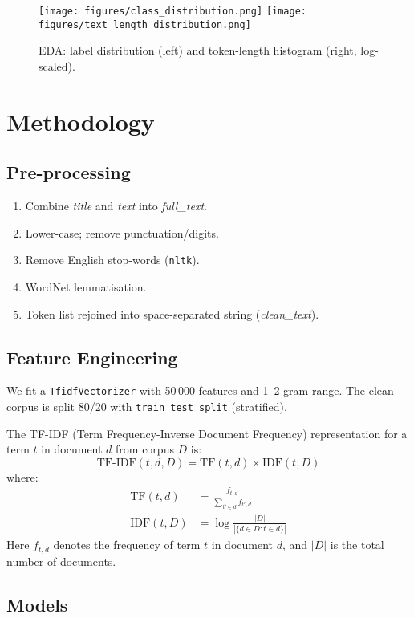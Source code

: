 \documentclass[11pt]{article}
\begin{document}
\begin{figure}[h]
\centering
\texttt{[image: figures/class\_distribution.png]}
\hfill
\texttt{[image: figures/text\_length\_distribution.png]}
\caption{EDA: label distribution (left) and token-length histogram
(right, log-scaled).}
\end{figure}

\section{Methodology}\label{sec:method}
\subsection{Pre-processing}
\begin{enumerate}[itemsep=0pt]
\item Combine \emph{title} and \emph{text} into \emph{full\_text}.
\item Lower-case; remove punctuation/digits.
\item Remove English stop-words (\texttt{nltk}).
\item WordNet lemmatisation.
\item Token list rejoined into space-separated string (\emph{clean\_text}).
\end{enumerate}

\subsection{Feature Engineering}
We fit a \texttt{TfidfVectorizer} with 50\,000 features and
1–2-gram range.  The clean corpus is split 80/20 with
\texttt{train\_test\_split} (stratified).

The TF-IDF (Term Frequency-Inverse Document Frequency) representation for a term $t$ in document $d$ from corpus $D$ is:
\begin{equation}
\text{TF-IDF}(t,d,D) = \text{TF}(t,d) \times \text{IDF}(t,D)
\end{equation}
where:
\begin{align}
\text{TF}(t,d) &= \frac{f_{t,d}}{\sum_{t' \in d} f_{t',d}} \\
\text{IDF}(t,D) &= \log \frac{|D|}{|\{d \in D : t \in d\}|}
\end{align}
Here $f_{t,d}$ denotes the frequency of term $t$ in document $d$, and $|D|$ is the total number of documents.

\subsection{Models}
\end{document}

